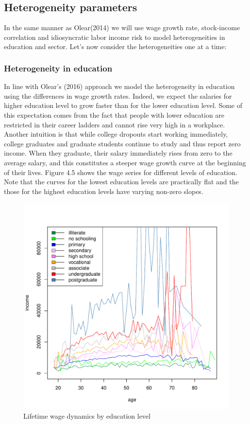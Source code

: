 \subsection{Heterogeneity parameters}
In the same manner as Olear(2014) we will use wage growth rate, stock-income correlation and idiosyncratic labor income risk to model heterogeneities in education and sector. Let's now consider the heterogeneities one at a time:

\subsubsection{Heterogeneity in education}
In line with Olear's (2016) approach we model the heterogeneity in education using the differences in wage growth rates. Indeed, we expect the salaries for higher education level to grow faster than for the lower education level. Some of this expectation comes from the fact that people with lower education are restricted in their career ladders and cannot rise very high in a workplace. Another intuition is that while college dropouts start working immediately, college graduates and graduate students continue to study and thus report zero income. When they graduate, their salary immediately rises from zero to the average salary, and this constitutes a steeper wage growth curve at the beginning of their lives. Figure 4.5 shows the wage series for different levels of education. Note that the curves for the lowest education levels are practically flat and the those for the highest education levels have varying non-zero slopes. 

\begin{figure}[h]
	\centering
	\includegraphics[scale=0.6]{figs/wage2educ.pdf}
	\caption{Lifetime wage dynamics by education level}
\end{figure}

